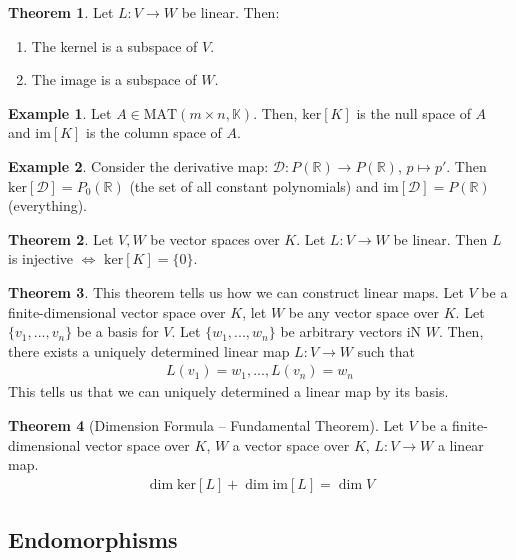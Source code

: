 \documentclass[11pt]{scrartcl}
\newcommand{\R}[0]{\mathbb{R}}
\theoremstyle{definition}
\newtheorem{theorem}{Theorem}
\newtheorem{ex}{Example}
\theoremstyle{remark}
\newcommand{\kernel}[1]{\text{ker}[#1]}
\newcommand{\image}[1]{\text{im}[#1]}
\newcommand{\mat}[1]{\text{MAT}(m \times n, \mathbb{#1})}
\begin{document}
\begin{theorem}
	Let $L: V \rightarrow W$ be linear. Then: 
	\begin{enumerate}[noitemsep]
		\item The kernel is a subspace of $V$. 
		\item The image is a subspace of $W$. 
	\end{enumerate}
\end{theorem}

\begin{ex} 
	Let $A \in \mat{K}$. Then, $\kernel{K}$ is the null space of $A$ and $\image{K}$ is the column space of $A$. 
\end{ex}

\begin{ex} 
	Consider the derivative map: $\mathcal{D}: P(\R) \rightarrow P(\R)$, $p \mapsto p'$. Then $\kernel{\mathcal{D}} = P_0(\R)$ (the set of all constant polynomials) and $\image{\mathcal{D}} = P(\R)$ (everything). 
\end{ex}


\begin{theorem}
	Let $V, W$ be vector spaces over $K$. Let $L: V \rightarrow W$ be linear. Then $L$ is injective $\iff$ $\kernel{K} = \{ 0 \}$. 
\end{theorem}

\begin{theorem}
	This theorem tells us how we can construct linear maps. Let $V$ be a finite-dimensional vector space over $K$, let $W$ be any vector space over $K$. Let $\{ v_1, ..., v_n \}$ be a basis for $V$. Let $\{ w_1, ..., w_n \}$ be arbitrary vectors iN $W$. Then, there exists a uniquely determined linear map $L: V \rightarrow W$ such that
	\begin{align}
		L(v_1) = w_1, ..., L(v_n) = w_n 	
	\end{align}
	This tells us that we can uniquely determined a linear map by its basis. 
\end{theorem}

\begin{theorem}[Dimension Formula -- Fundamental Theorem]
	Let $V$ be a finite-dimensional vector space over $K$, $W$ a vector space over $K$, $L: V \rightarrow W$ a linear map. 
	\begin{align}
		\dim{\kernel{L}} + \dim{ \image{L}} = \dim{V} 
	\end{align}
\end{theorem}

\subsection{Endomorphisms}
\end{document}
